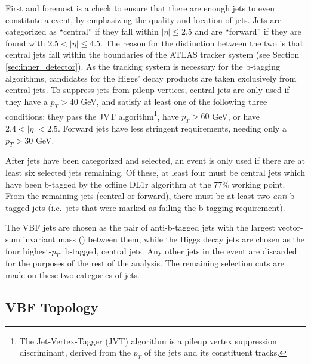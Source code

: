         First and foremost is a check to ensure that there are enough jets to even constitute a \vbfproc event,
            by emphasizing the quality and location of jets.
        Jets are categorized as ``central'' if they fall within $|\eta| \leq 2.5$
            and are ``forward'' if they are found with $ 2.5 < |\eta| \leq 4.5 $.
        The reason for the distinction between the two is that central jets fall within the boundaries of the ATLAS tracker system
            (see Section \ref{sec:inner_detector}).
        As the tracking system is necessary for the b-tagging algorithms,
            candidates for the Higgs' decay products are taken exclusively from central jets.
        To suppress jets from pileup vertices, central jets are only used if they have a $p_T > 40$ GeV,
            and satisfy at least one of the following three conditions:
            they pass the JVT algorithm\footnote{
                The Jet-Vertex-Tagger (JVT) algorithm is a pileup vertex suppression discriminant,
                    derived from the $p_T$ of the jets and its constituent tracks\cite{jvt_algo}.
            }, have $p_T > 60$ GeV, or have $2.4 < |\eta| < 2.5$.
        Forward jets have less stringent requirements, needing only a $p_T > 30$ GeV.

        After jets have been categorized and selected, an event is only used if there are at least six selected jets remaining.
        Of these, at least four must be central jets which have been b-tagged by the offline DL1r algorithm at the 77\% working point.
        From the remaining jets (central or forward), there must be at least two \textit{anti}-b-tagged jets
            (i.e.\ jets that were marked as failing the b-tagging requirement).

        The VBF jets are chosen as the pair of anti-b-tagged jets with the largest vector-sum invariant mass (\mjj) between them,
            while the Higgs decay jets are chosen as the four highest-$p_T$, b-tagged, central jets.
        Any other jets in the event are discarded for the purposes of the rest of the analysis.
        The remaining selection cuts are made on these two categories of jets.
        

    \pagebreak
    \subsection{VBF Topology}


